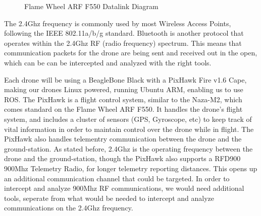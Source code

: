\documentclass[IEEEtran,letterpaper,10pt,titlepage,draftclsnofoot,onecolumn]{article}
\begin{document}
\begin{figure}[h]
  \caption{Flame Wheel ARF F550 Datalink Diagram}
  \label{fig:datalink_diagram}
\end{figure}

The 2.4Ghz frequency is commonly used by most Wireless Access Points, following the IEEE 802.11a/b/g
standard. Bluetooth is another protocol that operates within the 2.4Ghz RF (radio frequency)
spectrum\cite{HakDaSpectrum}. This means that communication packets for the drone are being sent and received out in the
open, which can be can be intercepted and analyzed with the right tools.

Each drone will be using a BeagleBone Black with a PixHawk Fire v1.6 Cape, making our drones Linux powered, running
Ubuntu ARM, enabling us to use ROS\cite{PixHawk}. The PixHawk is a flight control system, similar to the
Naza-M2, which comes standard on the Flame Wheel ARF F550. It handles the drone's flight system, and includes a cluster
of sensors (GPS, Gyroscope, etc) to keep track of vital information in order to maintain control over the drone while
in flight. The PixHawk also handles telementry communication between the drone and the ground-station. As stated before,
2.4Ghz is the operating frequency between the drone and the ground-station, though the PixHawk also supports a RFD900
900Mhz Telemetry Radio, for longer telemetry reporting distances\cite{PixHawkDocs}. This opens up an additional communication
channel that could be targeted. In order to intercept and analyze 900Mhz RF communications, we would need additional
tools, seperate from what would be needed to intercept and analyze communications on the 2.4Ghz
frequency\cite{HakDaSpectrum900}.
\end{document}
